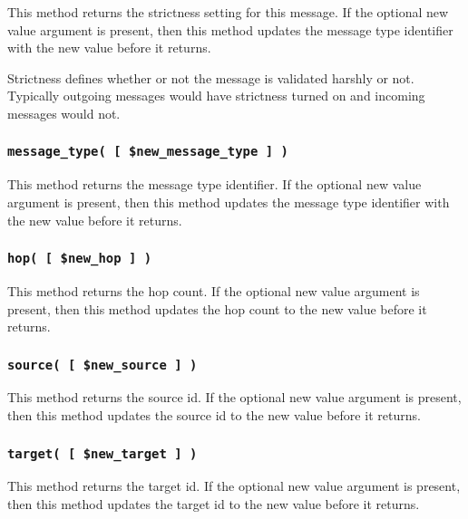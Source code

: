 This method returns the strictness setting for this message.  If the
optional new value argument is present, then this method updates the
message type identifier with the new value before it returns.



Strictness defines whether or not the message is validated harshly or
not.  Typically outgoing messages would have strictness turned on and
incoming messages would not.

\subsubsection*{\texttt{message\_type( [ \$new\_message\_type ] )}\label{xPL::Message_message_type_new_message_type_}}


This method returns the message type identifier.  If the optional new
value argument is present, then this method updates the message type
identifier with the new value before it returns.

\subsubsection*{\texttt{hop( [ \$new\_hop ] )}\label{xPL::Message_hop_new_hop_}}


This method returns the hop count.  If the optional new value argument
is present, then this method updates the hop count to the new value
before it returns.

\subsubsection*{\texttt{source( [ \$new\_source ] )}\label{xPL::Message_source_new_source_}}


This method returns the source id.  If the optional new value argument
is present, then this method updates the source id to the new value
before it returns.

\subsubsection*{\texttt{target( [ \$new\_target ] )}\label{xPL::Message_target_new_target_}}


This method returns the target id.  If the optional new value argument
is present, then this method updates the target id to the new value
before it returns.

